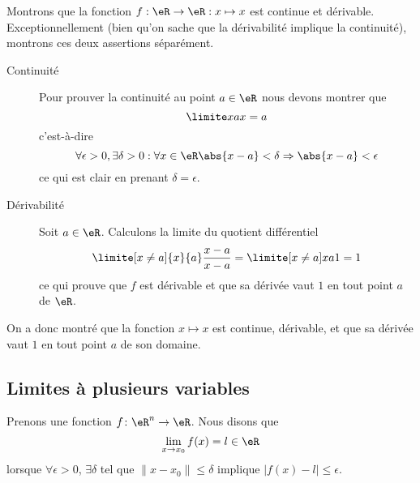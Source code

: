 \begin{example}
      Montrons que la fonction $f : \eR \to \eR : x\mapsto x$ est continue et dérivable. Exceptionnellement (bien qu'on sache que la dérivabilité implique la continuité), montrons ces deux assertions séparément.
      \begin{description}
      \item[Continuité] Pour prouver la continuité au point $a \in \eR$ nous devons montrer que
     \begin{equation}
       \limite x a x = a
     \end{equation}
     c'est-à-dire
     \begin{equation}
       \forall \epsilon > 0, \exists \delta > 0 :  \forall x \in \eR \abs{x-a} <
       \delta \Rightarrow \abs{x-a} < \epsilon
     \end{equation}
     ce qui est clair en prenant $\delta = \epsilon$.

      \item[Dérivabilité] Soit $a \in \eR$. Calculons la limite du quotient différentiel
        \begin{equation}
          \limite[x\neq a]{x}{a} \frac{x-a}{x-a} = \limite[x\neq a]x a 1 = 1
        \end{equation}
        ce qui prouve que $f$ est dérivable et que sa dérivée vaut $1$ en
        tout point $a$ de $\eR$.
      \end{description}

     On a donc montré que la fonction $x \mapsto x$ est continue, dérivable, et que sa dérivée vaut $1$ en tout point $a$ de son domaine.

\end{example}

\subsection{Limites à plusieurs variables}
		\label{SubSecLimVarsPlus}

Prenons une fonction $f\colon \eR^n\to \eR$. Nous disons que
\begin{equation}
	\lim_{x\to x_0}f(x)=l\in\eR
\end{equation}
lorsque $\forall \epsilon>0$, $\exists\delta$ tel que $\| x-x_0 \|\leq\delta$ implique $| f(x)-l |\leq \epsilon$. 

